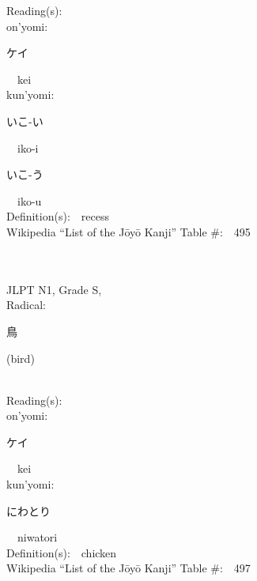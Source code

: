 \begin{multicols}{2}
Reading(s):\ \ \\
{\hspace*{1em}}on'yomi:\ \ \\
{\hspace*{2em}}{\begin{CJK}{UTF8}{min} ケイ \end{CJK}}\ \ kei\ \ \\
{\hspace*{1em}}kun'yomi:\ \ \\
{\hspace*{2em}}{\begin{CJK}{UTF8}{min} いこ-い \end{CJK}}\ \ iko-i\ \ \\
{\hspace*{2em}}{\begin{CJK}{UTF8}{min} いこ-う \end{CJK}}\ \ iko-u\ \ \\
Definition(s):\ \ recess \\
Wikipedia ``List of the J\=oy\=o Kanji'' Table \#:\ \ 495 \\
\ \ \\
{\fontsize{34pt}{40pt}  }\ \ \\
{JLPT N1, Grade S, \\Radical:\ \ {\begin{CJK}{UTF8}{min} 鳥 \end{CJK}} (bird) } \\
Reading(s):\ \ \\
{\hspace*{1em}}on'yomi:\ \ \\
{\hspace*{2em}}{\begin{CJK}{UTF8}{min} ケイ \end{CJK}}\ \ kei\ \ \\
{\hspace*{1em}}kun'yomi:\ \ \\
{\hspace*{2em}}{\begin{CJK}{UTF8}{min} にわとり \end{CJK}}\ \ niwatori\ \ \\
Definition(s):\ \ chicken \\
Wikipedia ``List of the J\=oy\=o Kanji'' Table \#:\ \ 497 \\
\ \ \\
{\fontsize{34pt}{40pt}  }\ \ \\  %

\end{multicols}
